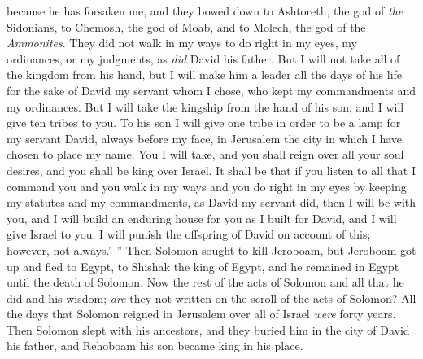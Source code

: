 \begin{biblechapter}
\verse because he has forsaken me, and they bowed down to Ashtoreth, the god of \textit{the} Sidonians, to Chemosh, the god of Moab, and to Molech, the god of the \textit{Ammonites}. They did not walk in my ways to do right in my eyes, my ordinances, or my judgments, as \textit{did} David his father.
\verse But I will not take all of the kingdom from his hand, but I will make him a leader all the days of his life for the sake of David my servant whom I chose, who kept my commandments and my ordinances.
\verse But I will take the kingship from the hand of his son, and I will give ten tribes to you.
\verse To his son I will give one tribe in order to be a lamp for my servant David, always before my face, in Jerusalem the city in which I have chosen to place my name.
\verse You I will take, and you shall reign over all your soul desires, and you shall be king over Israel.
\verse It shall be that if you listen to all that I command you and you walk in my ways and you do right in my eyes by keeping my statutes and my commandments, as David my servant did, then I will be with you, and I will build an enduring house for you as I built for David, and I will give Israel to you.
\verse I will punish the offspring of David on account of this; however, not always.’ ”
\verse Then Solomon sought to kill Jeroboam, but Jeroboam got up and fled to Egypt, to Shishak the king of Egypt, and he remained in Egypt until the death of Solomon.
\verse Now the rest of the acts of Solomon and all that he did and his wisdom; \textit{are} they not written on the scroll of the acts of Solomon?
\verse All the days that Solomon reigned in Jerusalem over all of Israel \textit{were} forty years.
\verse Then Solomon slept with his ancestors, and they buried him in the city of David his father, and Rehoboam his son became king in his place.
\end{biblechapter}

